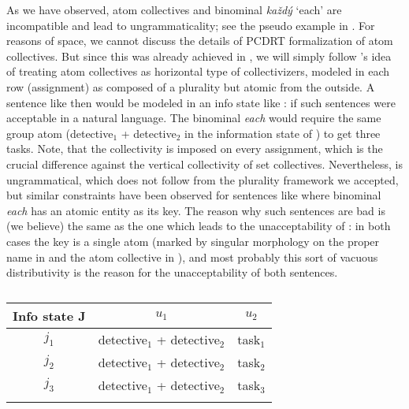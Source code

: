 \documentclass[output=paper,colorlinks,citecolor=brown,newtxmath]{langscibook}
\begin{document}
As we have observed, atom collectives and binominal \textit{každý} `each' are incompatible and lead to ungrammaticality; see the pseudo example in . For reasons of space, we cannot discuss the details of PCDRT formalization of atom collectives. But since this was already achieved in \cite{Dotlacil2013}, we will simply follow \citeauthor{Dotlacil2013}'s idea of treating atom collectives as horizontal type of collectivizers, modeled in each row (assignment) as composed of a plurality but atomic from the outside. A sentence like  then would be modeled in an info state like : if such sentences were acceptable in a natural language. The binominal \textit{each} would require the same group atom (detective$_1$ + detective$_2$ in the information state of ) to get three tasks. Note, that the collectivity is imposed on every assignment, which is the crucial difference against the vertical collectivity of set collectives. Nevertheless,  is ungrammatical, which does not follow from the plurality framework we accepted, but similar constraints have been observed for sentences like  where binominal \textit{each} has an atomic entity as its key.
The reason why such sentences are bad is (we believe) the same as the one which leads to the unacceptability of : in both cases the key is a single atom (marked by singular morphology on the proper name in  and the atom collective in ), and most probably this sort of vacuous distributivity is the reason for the unacceptability of both sentences.

\label{ex:sec-bin-each-atom-coll}
\z

\begin{table}
\centering
\begin{tabularx}{0.6\textwidth}{ccc}
\lsptoprule
Info state J & \(u_1\) & \(u_2\)\tabularnewline
\midrule
\(j_1\) & detective\(_1\) + detective\(_2\) & task\(_1\)\tabularnewline
\(j_2\) & detective\(_1\) + detective\(_2\) & task\(_2\)\tabularnewline
\(j_3\) & detective\(_1\) + detective\(_2\) & task\(_3\)\tabularnewline
\lspbottomrule
\end{tabularx}
\caption{}
\label{table6}
\end{table}

\z
\end{document}
